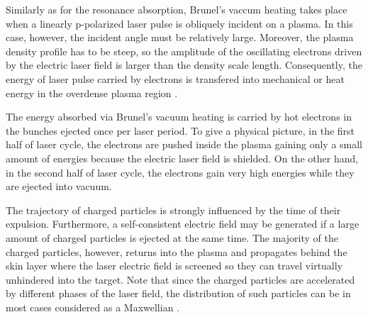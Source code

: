 Similarly as for the resonance absorption, Brunel's vaccum heating takes place when a linearly p-polarized laser pulse is obliquely incident on a plasma. In this case, however, the incident angle must be relatively large. Moreover, the plasma density profile has to be steep, so the amplitude of the oscillating electrons driven by the electric laser field is larger than the density scale length. Consequently, the energy of laser pulse carried by electrons is transfered into mechanical or heat energy in the overdense plasma region \cite{Gibbon2005}.

The energy absorbed via Brunel's vacuum heating is carried by hot electrons in the bunches
ejected once per laser period. To give a physical picture, in the first half of laser cycle, the electrons are pushed inside the plasma gaining only a small amount of energies because the electric laser field is shielded. On the other hand, in the second half of laser cycle, the electrons gain very high energies while they are ejected into vacuum. 

The trajectory of charged particles is strongly influenced by the time of their expulsion. Furthermore, a self-consistent electric field may be generated if a large amount of charged particles is ejected at the same time. The majority of the charged particles, however, returns into the plasma and propagates behind the skin layer where the laser electric field is screened so they can travel virtually unhindered into the target. Note that since the charged particles are accelerated by different phases of the laser field, the distribution of such particles can be in most cases considered as a Maxwellian \cite{Gibbon2005}.